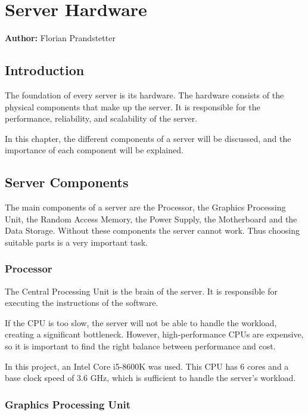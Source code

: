 \chapter{Server Hardware}
\label{chap:Server_Hardware}
\textbf{Author:} Florian Prandstetter

\section{Introduction}

The foundation of every server is its hardware. The hardware consists of the physical components that make up the server.
It is responsible for the performance, reliability, and scalability of the server.

In this chapter, the different components of a server will be discussed, and the importance of each component will be explained.

\section{Server Components}

The main components of a server are the Processor, the Graphics Processing Unit, the Random Access Memory, the Power Supply, the Motherboard and the Data Storage.
Without these components the server cannot work. Thus choosing suitable parts is a very important task.

\subsection{Processor}

The Central Processing Unit is the brain of the server. It is responsible for executing the instructions of the software. 

If the CPU is too slow, the server will not be able to handle the workload, creating a significant bottleneck. However, high-performance CPUs are expensive, so it is important to find the right balance between performance and cost.

In this project, an Intel Core i5-8600K was used. This CPU has 6 cores and a base clock speed of 3.6 GHz, which is sufficient to handle the server's workload.

\cite{i5}

\subsection{Graphics Processing Unit}

